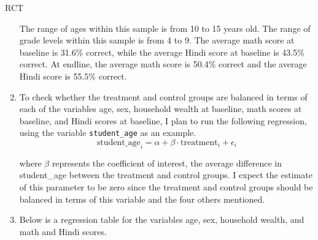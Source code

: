 \begin{homeworkProblem}{RCT}
\begin{solution}
\begin{enumerate}
                The range of ages within this sample is from 10 to 15 years 
                old. The range of grade levels within this sample is from 4 to 
                9. The average math score at baseline is 31.6\% correct, while 
                the average Hindi score at baseline is 43.5\% correct. At 
                endline, the average math score is 50.4\% correct and the 
                average Hindi score is 55.5\% correct.

            \item To check whether the treatment and control groups are
                balanced in terms of each of the variables age, sex, household
                wealth at baseline, math scores at baseline, and Hindi scores
                at baseline, I plan to run the following regression, using the
                variable \texttt{student\_age} as an example. 
                \[
                    \text{student\_age}_i = \alpha + \beta \cdot \text{treatment}_i + \epsilon_i
                \]

                where $\beta$ represents the coefficient of interest, the
                average difference in student\_age between the treatment and 
                control groups. I expect the estimate of this parameter to be 
                zero since the treatment and control groups should be balanced
                in terms of this variable and the four others mentioned. 

            \item Below is a regression table for the variables age, sex, 
                household wealth, and math and Hindi scores.


\end{enumerate}
\end{solution}
\end{homeworkProblem}
